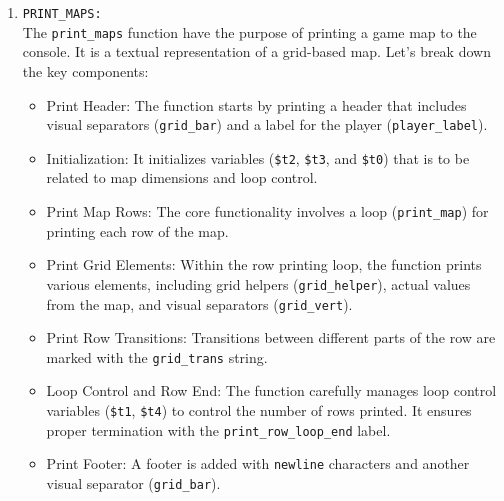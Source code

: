 \begin{enumerate}
    \item \large{\texttt{PRINT\_MAPS:}} \\[6pt]
    The \texttt{print\_maps} function have the purpose of printing a game map to the console. It is a textual representation of a grid-based map. Let's break down the key components:

    \begin{itemize}
        \item Print Header: The function starts by printing a header that includes visual separators (\texttt{grid\_bar}) and a label for the player (\texttt{player\_label}).
        \item Initialization: It initializes variables (\texttt{\$t2}, \texttt{\$t3}, and \texttt{\$t0}) that is to be related to map dimensions and loop control.
        \item Print Map Rows: The core functionality involves a loop (\texttt{print\_map}) for printing each row of the map.
        \item Print Grid Elements: Within the row printing loop, the function prints various elements, including grid helpers (\texttt{grid\_helper}), actual values from the map, and visual separators (\texttt{grid\_vert}).
        \item Print Row Transitions: Transitions between different parts of the row are marked with the \texttt{grid\_trans} string.
        \item Loop Control and Row End: The function carefully manages loop control variables (\texttt{\$t1}, \texttt{\$t4}) to control the number of rows printed. It ensures proper termination with the \texttt{print\_row\_loop\_end} label.
        \item Print Footer: A footer is added with \texttt{newline} characters and another visual separator (\texttt{grid\_bar}). \\
    \end{itemize}


\end{enumerate}

